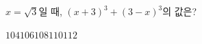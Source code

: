 $x=\sqrt{3}$일 때, $(x+3)^3+(3-x)^3$의 값은?
\begin{choices32}{$104$}{$106$}{$108$}{$110$}{$112$}\end{choices32}
